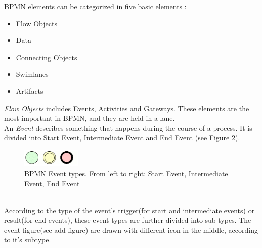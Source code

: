 BPMN elements can be categorized in five basic elements\cite{7} :
\begin{itemize}
	\item Flow Objects
	\item Data
	\item Connecting Objects
	\item Swimlanes
	\item Artifacts
\end{itemize}
\textit{Flow Objects} includes Events, Activities and Gateways. These elements are the most important in BPMN, and they are held in a lane.\\
An \textit{Event} describes something that happens during the course of a process. It is divided into Start Event, Intermediate Event and End Event (see Figure 2).
\begin{figure}[h]
	\centering
	\includegraphics[width=0.25\textwidth]{images/events.png}
	\caption{BPMN Event types. From left to right: Start Event, Intermediate Event, End Event}
	\label{fig:events}
\end{figure}
\\
According to the type of the event's trigger(for start and intermediate events) or result(for end events), these event-types are further divided into sub-types. The event figure(see add figure) are drawn with different icon in the middle, according to it's subtype.
 
